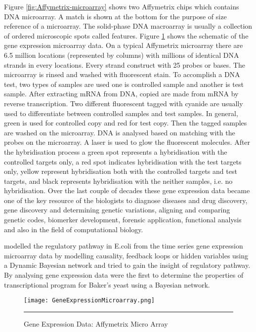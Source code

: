 Figure \ref{fig:Affymetrix-microarray} shows two Affymetrix chips which contains DNA microarray. 
A match is shown at the bottom for the purpose of size reference of a microarray.
The solid-phase DNA macroarray is usually a collection of ordered microscopic spots called features.
Figure \ref{fig:Gene Expression Microarray} shows the schematic of the gene expression microarray data. 
On a typical Affymetrix microarray there are 6.5 million locations (represented by columns) with 
millions of identical DNA strands in every locations. Every strand construct with 25 probes or bases. 
The microarray is rinsed and washed with fluorescent stain. To accomplish a DNA test, two types of
samples are used one is controlled sample and another is test sample. 
After extracting mRNA from DNA, copied are made from mRNA by reverse transcription. 
Two different fluorescent tagged with cyanide are usually used to differentiate between controlled 
samples and test samples. In general, green is used for controlled copy and red for test copy. 
Then the tagged samples are washed on the microarray. 
DNA is analysed based on matching with the probes on the microarray.
A laser is used to glow the fluorescent molecules. After the hybridisation process
a green spot represents a hybridisation with the controlled targets only, a red spot indicates 
hybridisation with the test targets only, yellow represent hybridisation both with the controlled 
targets and test targets, and black represents hybridisation with the neither samples, i.e. 
no hybridisation. Over the last couple of decades these gene expression data became one of the key 
resource of the biologists to diagnose diseases and drug discovery, gene discovery and determining 
genetic variations, aligning and comparing genetic codes, biomerker development, forensic application, 
functional analysis and also in the field of computational biology.

\cite{Ong:2002} modelled the regulatory pathway in E.coli
from the time series gene expression microarray data by modelling causality, feedback loops or 
hidden variables using a Dynamic Bayesian network and tried to gain the insight of regulatory pathway.
By analysing gene expression data \cite{Friedman:2000} were the first to determine the properties 
of transcriptional program for Baker's yeast using a Bayesian network.

\begin{figure}[t]
	\centering
		\texttt{[image: GeneExpressionMicroarray.png]}
		\rule{35em}{0.5pt}
	\caption{Gene Expression Data: Affymetrix Micro Array}
	\label{fig:Gene Expression Microarray}
\end{figure}

